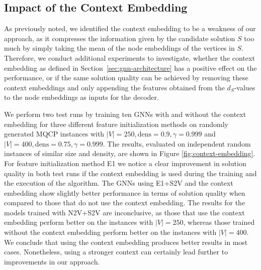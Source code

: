 \documentclass[draft,final]{vutinfth} %
\begin{document}

\subsection{Impact of the Context Embedding}
As previously noted, we identified the context embedding to be a weakness of our approach, as it compresses the information given by the candidate solution $S$ too much by simply taking the mean of the node embeddings of the vertices in $S$. 
Therefore, we conduct additional experiments to investigate, whether the context embedding as defined in Section~\ref{sec:gnn-architecture} has a positive effect on the performance, or if the same solution quality can be achieved by removing these context embeddings and only appending the features obtained from the $d_S$-values to the node embeddings as inputs for the decoder. 

We perform two test runs by training ten GNNs with and without the context embedding for three different feature initialization methods on randomly generated MQCP instances with $|V|=250, \mathrm{dens}=0.9, \gamma=0.999$ and $|V|=400, \mathrm{dens}=0.75, \gamma=0.999$. The results, evaluated on independent random instances of similar size and density, are shown in Figure \ref{fig:context-embedding}. For feature initialization method E1 we notice a clear improvement in solution quality in both test runs if the context embedding is used during the training and the execution of the algorithm. The GNNs using E1+S2V and the context embedding show slightly better performance in terms of solution quality when compared to those that do not use the context embedding. The results for the models trained with N2V+S2V are inconclusive, as those that use the context embedding perform better on the instances with $|V|=250$, whereas those trained without the context embedding perform better on the instances with $|V|=400$. We conclude that using the context embedding produces better results in most cases. Nonetheless, using a stronger context can certainly lead further to improvements in our approach. 
\end{document}
